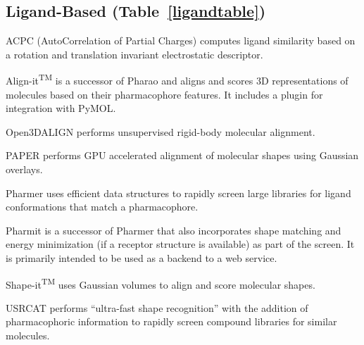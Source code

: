 \subsection*{Ligand-Based (Table~\ref{ligandtable})}

ACPC (AutoCorrelation of Partial Charges) \cite{Berenger_2014} computes ligand similarity based on a rotation and translation invariant electrostatic descriptor.

Align-it\textsuperscript{TM} is a successor of Pharao \cite{Taminau_2008} and aligns and scores 3D representations of molecules based on their pharmacophore features.  It includes a plugin for integration with PyMOL.

Open3DALIGN \cite{Tosco_2011} performs unsupervised rigid-body molecular alignment.

PAPER \cite{Haque_2010} performs GPU accelerated alignment of molecular shapes using Gaussian overlays.

Pharmer \cite{Koes_2011} uses efficient data structures to rapidly screen large libraries for ligand conformations that match a pharmacophore.

Pharmit \cite{Sunseri_2016} is a successor of Pharmer that also incorporates shape matching and energy minimization (if a receptor structure is available) as part of the screen.  It is primarily intended to be used as a backend to a web service.

Shape-it\textsuperscript{TM} uses Gaussian volumes to align and score molecular shapes.

USRCAT \cite{Schreyer_2012} performs ``ultra-fast shape recognition'' with the addition of pharmacophoric information to rapidly screen compound libraries for similar molecules.


